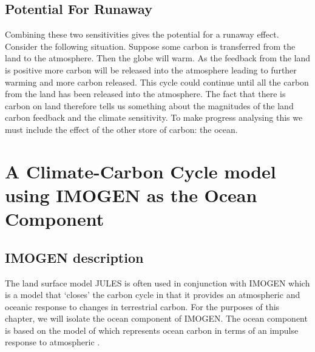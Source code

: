 \subsection{Potential For Runaway}
Combining these two sensitivities gives the potential for a runaway effect. Consider the following situation. Suppose some carbon is transferred from the land to the atmosphere. Then the globe
will warm. As the feedback from the land is positive more carbon will be released into the atmosphere leading to further warming and more carbon released. This cycle could continue until all the
carbon from the land has been released into the atmosphere. The fact that there is carbon on land therefore tells us something about the magnitudes of the land carbon feedback and the climate sensitivity.
To make progress analysing this we must include the effect of the other store of carbon: the ocean.

\section{A Climate-Carbon Cycle model using IMOGEN as the Ocean Component}
\subsection{IMOGEN description}
The land surface model JULES is often used in conjunction with IMOGEN \parencite{Huntingford2004,Huntingford2010} which is a model that `closes' the carbon cycle in that it provides
an atmospheric and oceanic response to changes in terrestrial carbon. For the purposes of this chapter, we will isolate the ocean component of IMOGEN. The ocean component is based on the
model of \cite{Joos1996} which represents ocean carbon in terms of an impulse response to atmospheric .

